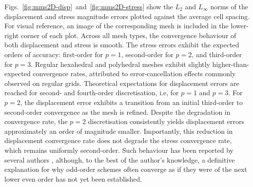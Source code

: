\documentclass[review,3p]{elsarticle}
\begin{document}
Figs.~\ref{fig:mms2D-disp}~and~\ref{fig:mms2D-stress} show the $L_2$ and $L_\infty$ norms of the displacement and stress magnitude errors plotted against the average cell spacing. For visual reference, an image of the corresponding mesh is included in the lower-right corner of each plot. Across all mesh types, the convergence behaviour of both displacement and stress is smooth. The stress errors exhibit the expected orders of accuracy: first-order for $p=1$, second-order for $p=2$, and third-order for $p=3$. Regular hexahedral and polyhedral meshes exhibit slightly higher-than-expected convergence rates, attributed to error-cancellation effects commonly observed on regular grids. 
Theoretical expectations for displacement errors are reached for second- and fourth-order discretisation, i.e, for $p=1$ and $p=3$. For 
$p=2$, the displacement error exhibits a transition from an initial third-order to second-order convergence as the mesh is refined.
Despite the degradation in convergence rate, the $p=2$ discretisation consistently yields displacement errors approximately an order of magnitude smaller. Importantly, this reduction in displacement convergence rate does not degrade the stress convergence rate, which remains uniformly second-order. Such behaviour has been reported by several authors \cite{Nishikawa2025a}, although, to the best of the author’s knowledge, a definitive explanation for why odd-order schemes often converge as if they were of the next lower even order has not yet been established.
\end{document}
